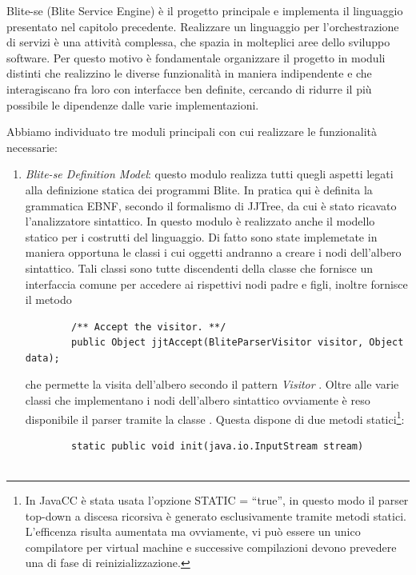 Blite-se (Blite Service Engine) è il progetto principale e implementa il
linguaggio presentato nel capitolo precedente. Realizzare un linguaggio per
l'orchestrazione di servizi è una attività complessa, che spazia in molteplici
aree dello sviluppo software. Per questo motivo è fondamentale organizzare il
progetto in moduli distinti che realizzino le diverse funzionalità in maniera
indipendente e che interagiscano fra loro con interfacce ben definite,
cercando di ridurre il più possibile le dipendenze dalle varie implementazioni.

Abbiamo individuato tre moduli principali con cui realizzare le funzionalità
necessarie:

\begin{enumerate}
  \item \emph{Blite-se Definition Model}: questo modulo realizza tutti quegli
  aspetti legati alla definizione statica dei programmi Blite. In pratica
  qui è definita la grammatica EBNF, secondo il formalismo di JJTree, da cui è 
  stato ricavato l'analizzatore sintattico. In questo modulo è realizzato anche
  il modello statico per i costrutti del linguaggio. Di fatto sono state
  implemetate in maniera opportuna le classi i cui oggetti andranno a creare i
  nodi dell'albero sintattico. Tali classi sono tutte discendenti della classe
   che fornisce un interfaccia comune per accedere ai
  rispettivi nodi padre e figli, inoltre fornisce il metodo
  	\lstset{frame=NONE}
	\begin{lstlisting}
		/** Accept the visitor. **/
		public Object jjtAccept(BliteParserVisitor visitor, Object data);
  	\end{lstlisting}  
  che permette la visita dell'albero secondo il pattern \emph{Visitor}
  \cite{GANGo4}. Oltre alle varie classi che implementano i nodi dell'albero sintattico  
  ovviamente è reso disponibile il parser tramite la classe .
  Questa dispone di due metodi statici\footnote{In JavaCC è stata usata
  l'opzione \textrm{STATIC = ``true''}, in questo modo il parser top-down a
  discesa ricorsiva è generato esclusivamente tramite metodi statici.
  L'efficenza risulta aumentata ma ovviamente, vi può essere un
  unico compilatore per virtual machine e successive compilazioni devono
  prevedere una di fase di reinizializzazione.}:
	\lstset{frame=NONE}
	\begin{lstlisting}	
		static public void init(java.io.InputStream stream)


\end{lstlisting}
\end{enumerate}
